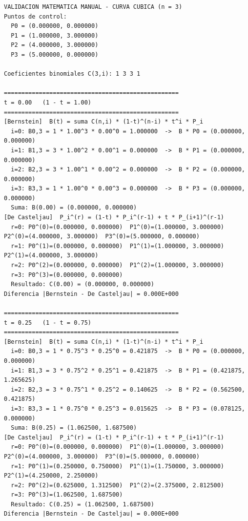 \begin{lstlisting}[caption={Salida de la validacion manual de la curva cubica.}, label={lst:anx_salida}, basicstyle=\ttfamily\scriptsize]
VALIDACION MATEMATICA MANUAL - CURVA CUBICA (n = 3)
Puntos de control:
  P0 = (0.000000, 0.000000)
  P1 = (1.000000, 3.000000)
  P2 = (4.000000, 3.000000)
  P3 = (5.000000, 0.000000)

Coeficientes binomiales C(3,i): 1 3 3 1 

==================================================
t = 0.00   (1 - t = 1.00)
==================================================
[Bernstein]  B(t) = suma C(n,i) * (1-t)^(n-i) * t^i * P_i
  i=0: B0,3 = 1 * 1.00^3 * 0.00^0 = 1.000000  ->  B * P0 = (0.000000, 0.000000)
  i=1: B1,3 = 3 * 1.00^2 * 0.00^1 = 0.000000  ->  B * P1 = (0.000000, 0.000000)
  i=2: B2,3 = 3 * 1.00^1 * 0.00^2 = 0.000000  ->  B * P2 = (0.000000, 0.000000)
  i=3: B3,3 = 1 * 1.00^0 * 0.00^3 = 0.000000  ->  B * P3 = (0.000000, 0.000000)
  Suma: B(0.00) = (0.000000, 0.000000)
[De Casteljau]  P_i^(r) = (1-t) * P_i^(r-1) + t * P_(i+1)^(r-1)
  r=0: P0^(0)=(0.000000, 0.000000)  P1^(0)=(1.000000, 3.000000)  P2^(0)=(4.000000, 3.000000)  P3^(0)=(5.000000, 0.000000)  
  r=1: P0^(1)=(0.000000, 0.000000)  P1^(1)=(1.000000, 3.000000)  P2^(1)=(4.000000, 3.000000)  
  r=2: P0^(2)=(0.000000, 0.000000)  P1^(2)=(1.000000, 3.000000)  
  r=3: P0^(3)=(0.000000, 0.000000)  
  Resultado: C(0.00) = (0.000000, 0.000000)
Diferencia |Bernstein - De Casteljau| = 0.000E+000

==================================================
t = 0.25   (1 - t = 0.75)
==================================================
[Bernstein]  B(t) = suma C(n,i) * (1-t)^(n-i) * t^i * P_i
  i=0: B0,3 = 1 * 0.75^3 * 0.25^0 = 0.421875  ->  B * P0 = (0.000000, 0.000000)
  i=1: B1,3 = 3 * 0.75^2 * 0.25^1 = 0.421875  ->  B * P1 = (0.421875, 1.265625)
  i=2: B2,3 = 3 * 0.75^1 * 0.25^2 = 0.140625  ->  B * P2 = (0.562500, 0.421875)
  i=3: B3,3 = 1 * 0.75^0 * 0.25^3 = 0.015625  ->  B * P3 = (0.078125, 0.000000)
  Suma: B(0.25) = (1.062500, 1.687500)
[De Casteljau]  P_i^(r) = (1-t) * P_i^(r-1) + t * P_(i+1)^(r-1)
  r=0: P0^(0)=(0.000000, 0.000000)  P1^(0)=(1.000000, 3.000000)  P2^(0)=(4.000000, 3.000000)  P3^(0)=(5.000000, 0.000000)  
  r=1: P0^(1)=(0.250000, 0.750000)  P1^(1)=(1.750000, 3.000000)  P2^(1)=(4.250000, 2.250000)  
  r=2: P0^(2)=(0.625000, 1.312500)  P1^(2)=(2.375000, 2.812500)  
  r=3: P0^(3)=(1.062500, 1.687500)  
  Resultado: C(0.25) = (1.062500, 1.687500)
Diferencia |Bernstein - De Casteljau| = 0.000E+000


\end{lstlisting}
